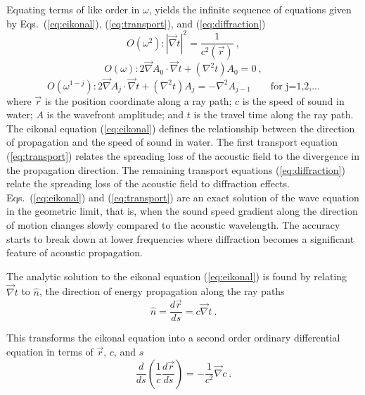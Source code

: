 \documentclass{ws-jca}
\begin{document}
Equating terms of like order in \(\omega\), yields the infinite sequence of
equations given by Eqs.~(\ref{eq:eikonal}), (\ref{eq:transport}), and
(\ref{eq:diffraction})
\begin{equation}
	O(\omega^2) : \left| \vec{\nabla}t \right|^2 = \frac{1}{c^2(\vec{r})} \:,
	\label{eq:eikonal}
\end{equation}
\begin{equation}
	O(\omega) : 2\vec{\nabla}A_0 \cdot \vec{\nabla}t + (\nabla^2t)A_0 = 0 \:,
	\label{eq:transport}
\end{equation}
\begin{equation}
	O(\omega^{1-j}) : 2\vec{\nabla}A_j \cdot \vec{\nabla}t + (\nabla^2t)A_j 
		= -\nabla^2 A_{j-1} \qquad \text{for j=1,2,...}
	\label{eq:diffraction}
\end{equation}
where 
\(\vec{r}\) is the position coordinate along a ray path;
$c$ is the speed of sound in water; 
$A$ is the wavefront amplitude; and 
$t$ is the travel time along the ray path. 
The eikonal equation (\ref{eq:eikonal}) defines the relationship between
the direction of propagation and the speed of sound in water. The first
transport equation (\ref{eq:transport}) relates the spreading loss of the
acoustic field to the divergence in the propagation direction. The
remaining transport equations (\ref{eq:diffraction}) relate the spreading
loss of the acoustic field to diffraction effects. Eqs.~(\ref{eq:eikonal})
and (\ref{eq:transport}) are an exact solution of the wave equation in the
geometric limit, that is, when the sound speed gradient along the direction
of motion changes slowly compared to the acoustic wavelength. The accuracy
starts to break down at lower frequencies where diffraction becomes a
significant feature of acoustic propagation.

The analytic solution to the eikonal equation (\ref{eq:eikonal}) is
found\cite{Jensen1994} by relating \(\vec{\nabla}t\) to \(\hat{n}\), the
direction of energy propagation along the ray paths
\begin{equation}
	\hat{n} = \frac{d\vec{r}}{ds} = c \vec{\nabla}t \:.
	\label{eq:ray_paths}
\end{equation}

This transforms the eikonal equation into a second order ordinary
differential equation in terms of \(\vec{r}\), $c$, and $s$
\begin{equation}
	\frac{d}{ds} \left( \frac{1}{c} \frac{d\vec{r}}{ds} \right) 
		= -\frac{1}{c^2} \vec{\nabla}c \:.
	\label{eq:ode2}
\end{equation}
\end{document}
